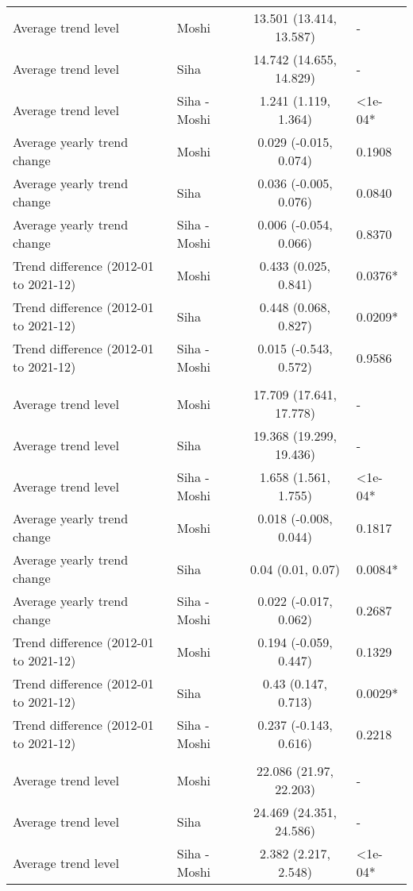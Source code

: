 \begin{longtable}{l|lcl}
\midrule\addlinespace[2.5pt]
Average trend level & Moshi & 13.501 (13.414, 13.587) & - \\ 
Average trend level & Siha & 14.742 (14.655, 14.829) & - \\ 
Average trend level & Siha - Moshi & 1.241 (1.119, 1.364) & <1e-04* \\ 
Average yearly trend change & Moshi & 0.029 (-0.015, 0.074) & 0.1908 \\ 
Average yearly trend change & Siha & 0.036 (-0.005, 0.076) & 0.0840 \\ 
Average yearly trend change & Siha - Moshi & 0.006 (-0.054, 0.066) & 0.8370 \\ 
Trend difference (2012-01 to 2021-12) & Moshi & 0.433 (0.025, 0.841) & 0.0376* \\ 
Trend difference (2012-01 to 2021-12) & Siha & 0.448 (0.068, 0.827) & 0.0209* \\ 
Trend difference (2012-01 to 2021-12) & Siha - Moshi & 0.015 (-0.543, 0.572) & 0.9586 \\ 
\midrule\addlinespace[2.5pt]
\multicolumn{4}{l}{Mean temp. (ºC)} \\ 
\midrule\addlinespace[2.5pt]
Average trend level & Moshi & 17.709 (17.641, 17.778) & - \\ 
Average trend level & Siha & 19.368 (19.299, 19.436) & - \\ 
Average trend level & Siha - Moshi & 1.658 (1.561, 1.755) & <1e-04* \\ 
Average yearly trend change & Moshi & 0.018 (-0.008, 0.044) & 0.1817 \\ 
Average yearly trend change & Siha & 0.04 (0.01, 0.07) & 0.0084* \\ 
Average yearly trend change & Siha - Moshi & 0.022 (-0.017, 0.062) & 0.2687 \\ 
Trend difference (2012-01 to 2021-12) & Moshi & 0.194 (-0.059, 0.447) & 0.1329 \\ 
Trend difference (2012-01 to 2021-12) & Siha & 0.43 (0.147, 0.713) & 0.0029* \\ 
Trend difference (2012-01 to 2021-12) & Siha - Moshi & 0.237 (-0.143, 0.616) & 0.2218 \\ 
\midrule\addlinespace[2.5pt]
\multicolumn{4}{l}{Max. temp. (ºC)} \\ 
\midrule\addlinespace[2.5pt]
Average trend level & Moshi & 22.086 (21.97, 22.203) & - \\ 
Average trend level & Siha & 24.469 (24.351, 24.586) & - \\ 
Average trend level & Siha - Moshi & 2.382 (2.217, 2.548) & <1e-04* \\ 

\end{longtable}
